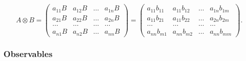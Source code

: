 \documentclass[fleqn,twoside]{article}      %
\begin{document}
\begin{equation}
A\otimes B
=
\left(
\begin{array}{cccccccccc}
a_{11} B& a_{12} B& \ldots & a_{1n}B \\
a_{21} B& a_{22} B& \ldots & a_{2n}B \\
\ldots & \ldots & \ldots & \ldots \\
a_{n1} B& a_{n2} B& \ldots & a_{nn}B
\end{array}
\right)
=
\left(
\begin{array}{cccccccccc}
a_{11} b_{11}& a_{11} b_{12} & \ldots & a_{1n}b_{1m} \\
a_{11} b_{21}& a_{11} b_{22}& \ldots & a_{2n} b_{2m}\\
\ldots & \ldots & \ldots & \ldots \\
a_{nn} b_{m1}& a_{nn} b_{m2}& \ldots & a_{nn} b_{mm}
\end{array}
\right)
.
\end{equation}

\subsubsection*{Observables}
\end{document}
